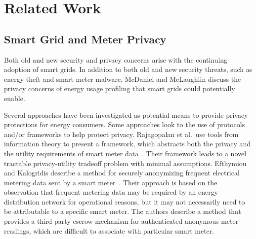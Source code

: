 \section{Related Work}
\label{sec:related}

\subsection{Smart Grid and Meter Privacy}






Both old and new security and privacy concerns arise with the continuing adoption of smart grids. In addition to both old and new security threats, such as energy theft and smart meter malware, McDaniel and McLaughlin discuss the privacy concerns of energy usage profiling that smart grids could potentially enable\cite{mcdaniel2009security}. 

Several approaches have been investigated as potential means to provide privacy protections for energy consumers. Some approaches look to the use of protocols and/or frameworks to help protect privacy. Rajagopalan et al.\ use tools from information theory to present a framework, which abstracts both the privacy and the utility requirements of smart meter data~\cite{rajagopalan2011smart,sankar2013smart}. Their framework leads to a novel tractable privacy-utility tradeoff problem with minimal assumptions. Efthymiou and Kalogridis describe a method for securely anonymizing frequent electrical metering data sent by a smart meter~\cite{efthymiou2010smart}. 
Their approach is based on the observation that frequent metering data may be required by an energy distribution network for operational reasons, but it may not necessarily need to be attributable to a specific smart meter.
The authors describe a method that provides a third-party escrow mechanism for authenticated anonymous meter readings, which are difficult to associate with particular smart meter.

